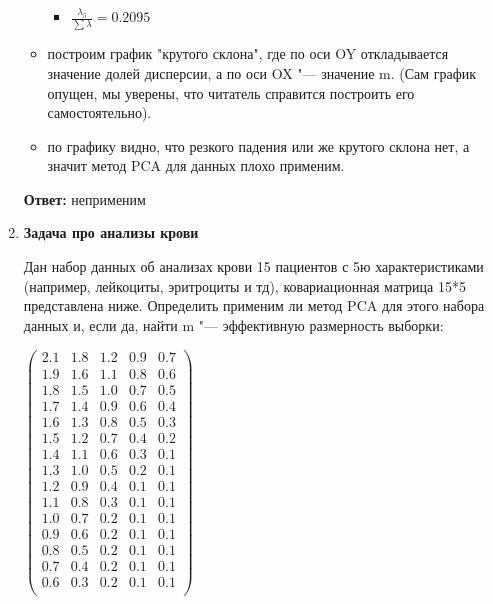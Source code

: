 \begin{enumerate}
\begin{itemize}
\begin{itemize}
                \item $\frac{ \lambda_5 }{\sum \lambda}  = 0.2095$
            \end{itemize} \par
        \item построим график "крутого склона", где по оси OY откладывается значение долей дисперсии, а по оси OX "--- значение m. (Сам график опущен, мы уверены, что читатель справится построить его самостоятельно). \par
        \item по графику видно, что резкого падения или же крутого склона нет, а значит метод PCA для данных плохо применим.
     \end{itemize}\par
     \textbf{Ответ:} неприменим
    \item \textbf{Задача про анализы крови} \par
    Дан набор данных об анализах крови 15 пациентов с 5ю характеристиками (например, лейкоциты, эритроциты и тд), ковариационная матрица 15*5 представлена ниже. Определить применим ли метод PCA для этого набора данных и, если да, найти m "--- эффективную размерность выборки:\par    $\begin{pmatrix}
      2.1  & 1.8 & 1.2 & 0.9 & 0.7 \\
      1.9  & 1.6 & 1.1 & 0.8 & 0.6 \\
      1.8  & 1.5 & 1.0 & 0.7 & 0.5 \\
      1.7  & 1.4 & 0.9 & 0.6 & 0.4 \\
      1.6  & 1.3 & 0.8 & 0.5 & 0.3 \\
      1.5  & 1.2 & 0.7 & 0.4 & 0.2 \\
      1.4  & 1.1 & 0.6 & 0.3 & 0.1 \\
      1.3  & 1.0 & 0.5 & 0.2 & 0.1 \\
      1.2  & 0.9 & 0.4 & 0.1 & 0.1 \\
      1.1  & 0.8 & 0.3 & 0.1 & 0.1 \\
      1.0  & 0.7 & 0.2 & 0.1 & 0.1 \\
      0.9  & 0.6 & 0.2 & 0.1 & 0.1 \\
      0.8  & 0.5 & 0.2 & 0.1 & 0.1 \\
      0.7  & 0.4 & 0.2 & 0.1 & 0.1 \\
      0.6  & 0.3 & 0.2 & 0.1 & 0.1 \\
     \end{pmatrix}$ \par

\end{enumerate}
